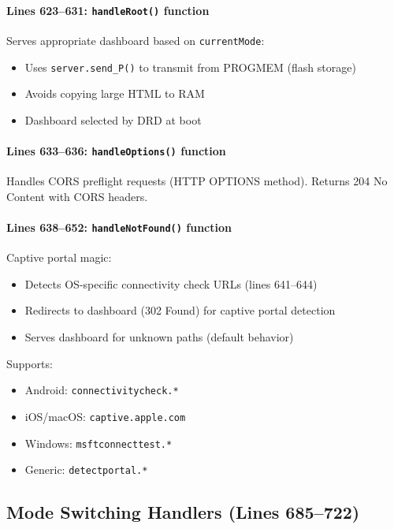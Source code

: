 \documentclass[11pt,a4paper]{article}
\begin{document}
\paragraph{Lines 623--631: \texttt{handleRoot()} function}
Serves appropriate dashboard based on \texttt{currentMode}:
\begin{itemize}[leftmargin=*]
  \item Uses \texttt{server.send\_P()} to transmit from PROGMEM (flash storage)
  \item Avoids copying large HTML to RAM
  \item Dashboard selected by DRD at boot
\end{itemize}

\paragraph{Lines 633--636: \texttt{handleOptions()} function}
Handles CORS preflight requests (HTTP OPTIONS method). Returns 204 No Content with CORS headers.

\paragraph{Lines 638--652: \texttt{handleNotFound()} function}
Captive portal magic:
\begin{itemize}[leftmargin=*]
  \item Detects OS-specific connectivity check URLs (lines 641--644)
  \item Redirects to dashboard (302 Found) for captive portal detection
  \item Serves dashboard for unknown paths (default behavior)
\end{itemize}

Supports:
\begin{itemize}[leftmargin=*]
  \item Android: \texttt{connectivitycheck.*}
  \item iOS/macOS: \texttt{captive.apple.com}
  \item Windows: \texttt{msftconnecttest.*}
  \item Generic: \texttt{detectportal.*}
\end{itemize}

\subsection{Mode Switching Handlers (Lines 685--722)}
\end{document}

